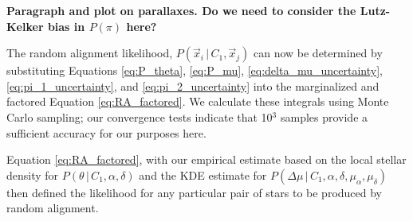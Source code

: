 \documentclass[usenatbib]{mnras}
\newcommand{\given}{\,|\,}
\begin{document}
{\bf Paragraph and plot on parallaxes. Do we need to consider the Lutz-Kelker bias in $P(\pi)$ here?}


The random alignment likelihood, $P(\vec{x}_i \given C_1, \vec{x}_j)$ can now be determined by substituting  Equations \ref{eq:P_theta}, \ref{eq:P_mu}, \ref{eq:delta_mu_uncertainty}, \ref{eq:pi_1_uncertainty}, and \ref{eq:pi_2_uncertainty} into the marginalized and factored Equation \ref{eq:RA_factored}. We calculate these integrals using Monte Carlo sampling; our convergence tests indicate that 10$^3$ samples provide a sufficient accuracy for our purposes here.




Equation \ref{eq:RA_factored}, with our empirical estimate based on the local stellar density for $P(\theta \given C_1, \alpha, \delta)$ and the KDE estimate for $P(\Delta \mu \given C_1, \alpha, \delta, \mu_{\alpha}, \mu_{\delta})$ then defined the likelihood for any particular pair of stars to be produced by random alignment.
\end{document}
